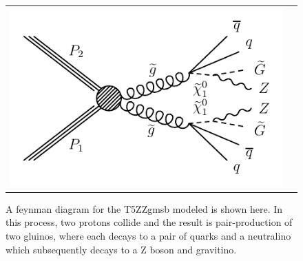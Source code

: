 \begin{figure}[!ht]
\begin{center}
\begin{tabular}{cc}
\includegraphics[]{intro/figs/Feynman_graph_T5ZZgmsb.pdf}
\end{tabular}
\caption{ A feynman diagram for the T5ZZgmsb modeled is shown here.
  In this process, two protons collide and the result is pair-production of two gluinos,
  where each decays to a pair of quarks and a neutralino which subsequently decays to a Z boson and gravitino.
\label{fig:SMS_T5ZZgmsb}
}
\end{center}
\end{figure}

